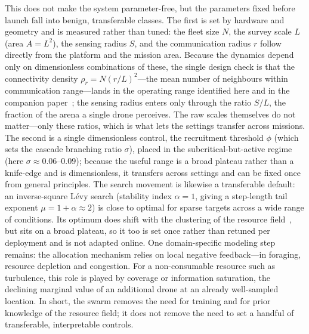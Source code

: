\documentclass{article}
\begin{document}
This does not make the system parameter-free, but the parameters fixed before launch fall into benign,
transferable classes. The first is set by hardware and geometry and is measured rather than tuned: the fleet
size $N$, the survey scale $L$ (area $A=L^2$), the sensing radius $S$, and the communication radius $r$ follow
directly from the platform and the mission area. Because the dynamics depend only on dimensionless combinations
of these, the single design check is that the connectivity density $\rho_r=N(r/L)^2$---the mean number of
neighbours within communication range---lands in the operating range identified here and in the companion
paper~\citep{partI}; the sensing radius enters only through the ratio $S/L$, the fraction of the arena a single
drone perceives. The raw scales themselves do not matter---only these ratios, which is what lets the settings
transfer across missions. The second is a single dimensionless control, the recruitment threshold $\phi$
(which sets the cascade branching ratio $\sigma$), placed in the subcritical-but-active regime (here
$\sigma\approx0.06$--$0.09$); because the useful range is a broad plateau rather than a knife-edge and is
dimensionless, it transfers across settings and can be fixed once from general principles. The search movement
is likewise a transferable default: an inverse-square L\'evy search (stability index $\alpha=1$, giving a
step-length tail exponent $\mu=1+\alpha\approx2$) is close to optimal for sparse targets across a wide range of
conditions. Its optimum
does shift with the clustering of the resource field~\citep{partI}, but sits on a broad plateau, so it too is
set once rather than retuned per deployment and is not adapted online. One domain-specific modeling step
remains: the allocation mechanism relies on local negative feedback---in foraging, resource depletion and
congestion. For a non-consumable resource such as turbulence, this role is played by coverage or information
saturation, the declining marginal value of an additional drone at an already well-sampled location. In short,
the swarm removes the need for training and for prior knowledge of the resource field; it does not remove the
need to set a handful of transferable, interpretable controls.

\end{document}
